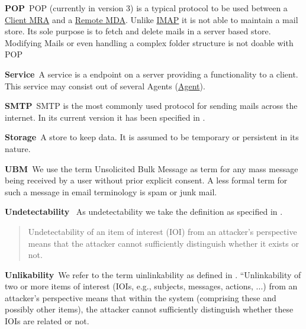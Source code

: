 \documentclass[a4paper,appendixprefix,pdfusetitle,twocolumn,draft,8pt]{scrbook}
\newenvironment{entry}{\par\leavevmode\hangpara{1.5mm}{1}\ignorespaces}{\RaggedRight\par}
\newcommand*{\mainentry}[2]{{\bfseries{#1\label{def:#1}}}~#2\par}
\newcommand*{\defref}[1]{\hyperref[def:#1]{#1}}
\begin{document}
\begin{entry}
  \mainentry{POP}{POP (currently in version 3) is a typical protocol to be used between a \defref{Client MRA} and a \defref{Remote MDA}. Unlike \defref{IMAP} it is not able to maintain a mail store. Its sole purpose is to fetch and delete mails in a server based store. Modifying Mails or even handling a complex folder structure is not doable with POP}
\end{entry}

\begin{entry}
  \mainentry{Service}{A service is a endpoint on a server providing a functionality to a client. This service may consist out of several Agents (\defref{Agent}).}
\end{entry}

\begin{entry}
  \mainentry{SMTP}{SMTP is the most commonly used protocol for sending mails across the internet. In its current version it has been specified in \cite{RFC5321}.}
\end{entry}

\begin{entry}
  \mainentry{Storage}{A store to keep data. It is assumed to be temporary or persistent in its nature.}
\end{entry}

\begin{entry}
	\mainentry{UBM}{We use the term Unsolicited Bulk Message as term for any mass message being received by a user without prior explicit consent. A less formal term for such a message in email terminology is spam or junk mail.}
\end{entry}

\begin{entry}
	\mainentry{Undetectability}{
		As undetectability we take the definition as specified in \cite{anon_terminology}.
		\begin{quote}
			Undetectability of an item of interest (IOI\index{Item of Interest}) from an attacker's perspective means that the
			attacker cannot sufficiently distinguish whether it exists or not.\omitted
		\end{quote}
	}
\end{entry}

\begin{entry}
  \mainentry{Unlikability}{We refer to the term uinlinkability as defined in \cite{anon_terminology}. ``Unlinkability of two or more items of interest (IOIs, e.g., subjects, messages, actions, ...) from an attacker’s perspective means that within the system (comprising these and possibly other items), the attacker cannot sufficiently distinguish whether these IOIs are 
  	related or not.}
\end{entry}
\end{document}
